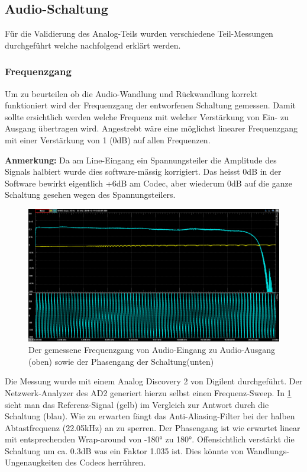 \subsection{Audio-Schaltung}
\label{subsec:Audio-Schaltung}

Für die Validierung des Analog-Teils wurden verschiedene Teil-Messungen durchgeführt welche nachfolgend erklärt werden.

\subsubsection{Frequenzgang}
\label{subsubsec:Frequenzgang}
Um zu beurteilen ob die Audio-Wandlung und Rückwandlung korrekt funktioniert wird der Frequenzgang der entworfenen Schaltung gemessen. Damit sollte ersichtlich werden welche Frequenz mit welcher Verstärkung von Ein- zu Ausgang übertragen wird. Angestrebt wäre eine möglichst linearer Frequenzgang mit einer Verstärkung von 1 (0dB) auf allen Frequenzen.

\textbf{Anmerkung:} Da am Line-Eingang ein Spannungsteiler die Amplitude des Signals halbiert wurde dies software-mässig korrigiert. Das heisst 0dB in der Software bewirkt eigentlich +6dB am Codec, aber wiederum 0dB auf die ganze Schaltung gesehen wegen des Spannungsteilers.

\begin{figure} [H]
\begin{center}
 \includegraphics[width=\textwidth]{../graphics/FREQ_LineINOUT.png}
 \caption{Der gemessene Frequenzgang von Audio-Eingang zu Audio-Ausgang (oben) sowie der Phasengang der Schaltung(unten)}
\label{fig:frequenzgang}
\end{center}
\end{figure}
Die Messung wurde mit einem Analog Discovery 2 von Digilent durchgeführt. Der Netzwerk-Analyzer des AD2 generiert hierzu selbst einen Frequenz-Sweep. In \ref{fig:frequenzgang} sieht man das Referenz-Signal (gelb) im Vergleich zur Antwort durch die Schaltung (blau). Wie zu erwarten fängt das Anti-Aliasing-Filter bei der halben Abtastfrequenz (22.05kHz) an zu sperren. Der Phasengang ist wie erwartet linear mit entsprechenden Wrap-around von -180° zu 180°.
Offensichtlich verstärkt die Schaltung um ca. 0.3dB was ein Faktor 1.035 ist. Dies könnte von Wandlungs-Ungenaugkeiten des Codecs herrühren.

